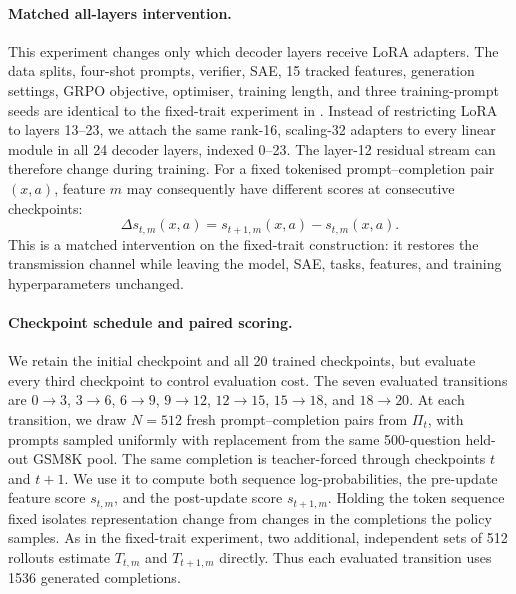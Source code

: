 \paragraph{Matched all-layers intervention.}
This experiment changes only which decoder layers receive LoRA adapters.
The data splits, four-shot prompts, verifier, SAE, 15 tracked features,
generation settings, GRPO objective, optimiser, training length, and three
training-prompt seeds are identical to the fixed-trait experiment in
.  Instead of restricting LoRA to layers 13--23,
we attach the same rank-16, scaling-32 adapters to every linear module in all
24 decoder layers, indexed 0--23.  The layer-12 residual stream can therefore
change during training.  For a fixed tokenised prompt--completion pair
$(x,a)$, feature $m$ may consequently have different scores at consecutive
checkpoints:
\begin{equation*}
\Delta s_{t,m}(x,a)
=
s_{t+1,m}(x,a)-s_{t,m}(x,a).
\end{equation*}
This is a matched intervention on the fixed-trait construction: it restores
the transmission channel while leaving the model, SAE, tasks, features, and
training hyperparameters unchanged.

\paragraph{Checkpoint schedule and paired scoring.}
We retain the initial checkpoint and all 20 trained checkpoints, but evaluate
every third checkpoint to control evaluation cost.  The seven evaluated
transitions are $0\!\to\!3$, $3\!\to\!6$, $6\!\to\!9$,
$9\!\to\!12$, $12\!\to\!15$, $15\!\to\!18$, and
$18\!\to\!20$.  At each transition, we draw $N=512$ fresh
prompt--completion pairs from $\Pi_t$, with prompts sampled uniformly with
replacement from the same 500-question held-out GSM8K pool.  The same
completion is teacher-forced through checkpoints $t$ and $t+1$.  We use it
to compute both sequence log-probabilities, the pre-update feature score
$s_{t,m}$, and the post-update score $s_{t+1,m}$.  Holding the token sequence
fixed isolates representation change from changes in the completions the
policy samples.  As in the fixed-trait experiment, two additional,
independent sets of 512 rollouts estimate $T_{t,m}$ and $T_{t+1,m}$ directly.
Thus each evaluated transition uses 1536 generated completions.

